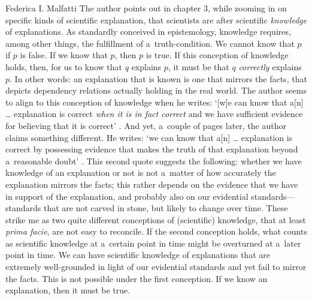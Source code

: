 \begin{recengenv}{Federica I. Malfatti}
\enlargethispage{-.5\baselineskip}
The author points out in chapter 3, while zooming in on specific kinds of scientific explanation, that scientists are after scientific \textit{knowledge} of explanations. As standardly conceived in epistemology, knowledge requires, among other things, the fulfillment of a~truth-condition. We cannot know that $p$ if $p$ is false. If we know that $p$, then $p$ is true. If this conception of knowledge holds, then, for us to know that $q$ explains $p$, it must be that $q$ \textit{correctly} explains $p$. In other words: an explanation that is known is one that mirrors the facts, that depicts dependency relations actually holding in the real world. The author seems to align to this conception of knowledge when he writes: ‘[w]e can know that a[n] … explanation is correct \textit{when it is in fact correct} and we have sufficient evidence for believing that it is correct'
\parencite[][p.38, emphasis added]{mccain_understanding_2022}. %
 And yet, a~couple of pages later, the author claims something different. He writes: ‘we can know that a[n] … explanation is correct by possessing evidence that makes the truth of that explanation beyond a~reasonable doubt' 
\parencite[][p.40]{mccain_understanding_2022}. %
 This second quote suggests the following: whether we have knowledge of an explanation or not is not a~matter of how accurately the explanation mirrors
 the facts; this rather depends on the evidence that we have in support of the explanation, and probably also
 on our evidential standards---standards that are not carved in stone, but likely to change over time. These strike me as two quite different conceptions of (scientific) knowledge, that at least \textit{prima facie}, are not easy to reconcile. If the second conception holds, what counts as scientific knowledge at a~certain point in time might be overturned at a~later point in time. We can have scientific knowledge of explanations that are extremely well-grounded in light of our evidential standards and yet fail to mirror the facts. This is not possible under the first conception. If we know an explanation, then it must be true.


\end{recengenv}
